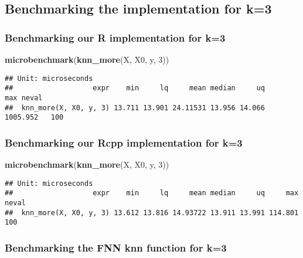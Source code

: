 \documentclass[]{article}
\newenvironment{Shaded}{\begin{snugshade}}{\end{snugshade}}
\newcommand{\DecValTok}[1]{\textcolor[rgb]{0.00,0.00,0.81}{#1}}
\newcommand{\KeywordTok}[1]{\textcolor[rgb]{0.13,0.29,0.53}{\textbf{#1}}}
\newcommand{\NormalTok}[1]{#1}
\begin{document}
\hypertarget{benchmarking-the-implementation-for-k3}{%
\subsection{Benchmarking the implementation for
k=3}\label{benchmarking-the-implementation-for-k3}}

\hypertarget{benchmarking-our-r-implementation-for-k3}{%
\subsubsection{Benchmarking our R implementation for
k=3}\label{benchmarking-our-r-implementation-for-k3}}

\begin{Shaded}
\begin{Highlighting}[]
\KeywordTok{microbenchmark}\NormalTok{(}\KeywordTok{knn_more}\NormalTok{(X, X0, y, }\DecValTok{3}\NormalTok{))}
\end{Highlighting}
\end{Shaded}

\begin{verbatim}
## Unit: microseconds
##                   expr    min     lq     mean median     uq      max neval
##  knn_more(X, X0, y, 3) 13.711 13.901 24.11531 13.956 14.066 1005.952   100
\end{verbatim}

\hypertarget{benchmarking-our-rcpp-implementation-for-k3}{%
\subsubsection{Benchmarking our Rcpp implementation for
k=3}\label{benchmarking-our-rcpp-implementation-for-k3}}

\begin{Shaded}
\begin{Highlighting}[]
\KeywordTok{microbenchmark}\NormalTok{(}\KeywordTok{knn_more}\NormalTok{(X, X0, y, }\DecValTok{3}\NormalTok{))}
\end{Highlighting}
\end{Shaded}

\begin{verbatim}
## Unit: microseconds
##                   expr    min     lq     mean median     uq     max neval
##  knn_more(X, X0, y, 3) 13.612 13.816 14.93722 13.911 13.991 114.801   100
\end{verbatim}

\hypertarget{benchmarking-the-fnn-knn-function-for-k3}{%
\subsubsection{Benchmarking the FNN knn function for
k=3}\label{benchmarking-the-fnn-knn-function-for-k3}}
\end{document}
